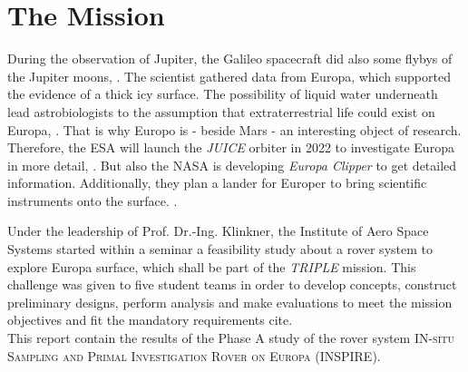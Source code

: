 %
%
%
\chapter{The Mission}
\label{chap:mission}

During the observation  of Jupiter, the Galileo spacecraft did also some flybys of the Jupiter moons, \cite{Mission_01}.
The scientist gathered data from Europa, which supported the evidence of a thick icy surface.
The possibility of liquid water underneath lead astrobiologists to the assumption that extraterrestrial life could exist on Europa, \cite{Mission_02}.
That is why Europo is - beside Mars - an interesting object of research.\\

Therefore, the ESA will launch the \textit{JUICE} orbiter in 2022 to investigate Europa in more detail, \cite{Mission_03}. 
But also the NASA is developing  \textit{Europa Clipper} to get detailed information.
Additionally, they plan a lander for Europer to bring scientific instruments onto the surface. \cite{Mission_04} \cite{Mission_05}.

Under the leadership of  Prof. Dr.-Ing. Klinkner, the Institute of Aero Space Systems started within a seminar a feasibility study about a rover system to explore Europa surface, which shall  be part of the \textit{TRIPLE} mission.
This challenge was given to five student teams in order to develop concepts, construct preliminary designs, perform analysis and make evaluations to  meet the mission objectives and fit the mandatory requirements cite. \\


This report contain the results of the Phase A study of the rover system \textsc{IN-situ Sampling and Primal Investigation Rover on Europa}  (INSPIRE).